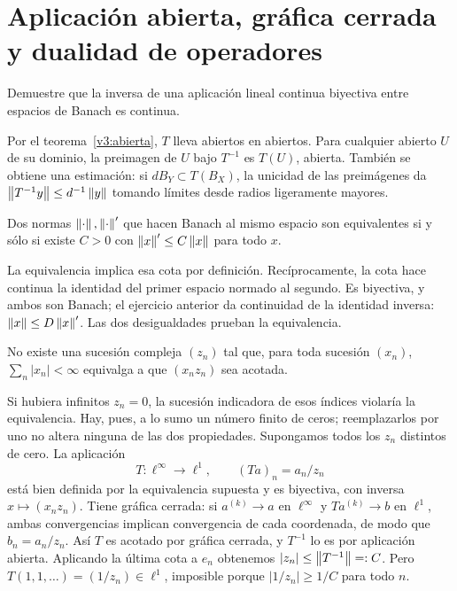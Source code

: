 \chapter{Aplicación abierta, gráfica cerrada y dualidad de operadores}

\begin{ejercicio}\label{ej:v3-l03-1}
Demuestre que la inversa de una aplicación lineal continua biyectiva entre espacios de Banach es continua.
\end{ejercicio}
\begin{solucion}
Por el teorema~\ref{v3:abierta}, $T$ lleva abiertos en abiertos. Para cualquier abierto $U$ de su dominio, la preimagen de $U$ bajo $T^{-1}$ es $T(U)$, abierta. También se obtiene una estimación: si $dB_Y\subset T(B_X)$, la unicidad de las preimágenes da $\left\lVert T^{-1}y\right\rVert\le d^{-1}\left\lVert y\right\rVert$ tomando límites desde radios ligeramente mayores.
\end{solucion}

\begin{ejercicio}\label{ej:v3-l03-2}
Dos normas $\left\lVert\cdot\right\rVert,\left\lVert\cdot\right\rVert'$ que hacen Banach al mismo espacio son equivalentes si y sólo si existe $C>0$ con $\left\lVert x\right\rVert'\le C\left\lVert x\right\rVert$ para todo $x$.
\end{ejercicio}
\begin{solucion}
La equivalencia implica esa cota por definición. Recíprocamente, la cota hace continua la identidad del primer espacio normado al segundo. Es biyectiva, y ambos son Banach; el ejercicio anterior da continuidad de la identidad inversa: $\left\lVert x\right\rVert\le D\left\lVert x\right\rVert'$. Las dos desigualdades prueban la equivalencia.
\end{solucion}

\begin{ejercicio}\label{ej:v3-l03-3}
No existe una sucesión compleja $(z_n)$ tal que, para toda sucesión $(x_n)$, $\sum_n|x_n|<\infty$ equivalga a que $(x_nz_n)$ sea acotada.
\end{ejercicio}
\begin{solucion}
Si hubiera infinitos $z_n=0$, la sucesión indicadora de esos índices violaría la equivalencia. Hay, pues, a lo sumo un número finito de ceros; reemplazarlos por uno no altera ninguna de las dos propiedades. Supongamos todos los $z_n$ distintos de cero. La aplicación
\[T:\ell^\infty\longrightarrow\ell^1,\qquad (Ta)_n=a_n/z_n\]
está bien definida por la equivalencia supuesta y es biyectiva, con inversa $x\mapsto(x_nz_n)$. Tiene gráfica cerrada: si $a^{(k)}\to a$ en $\ell^\infty$ y $Ta^{(k)}\to b$ en $\ell^1$, ambas convergencias implican convergencia de cada coordenada, de modo que $b_n=a_n/z_n$. Así $T$ es acotado por gráfica cerrada, y $T^{-1}$ lo es por aplicación abierta. Aplicando la última cota a $e_n$ obtenemos $|z_n|\le\left\lVert T^{-1}\right\rVert=:C$. Pero $T(1,1,\ldots)=(1/z_n)\in\ell^1$, imposible porque $|1/z_n|\ge1/C$ para todo $n$.
\end{solucion}

